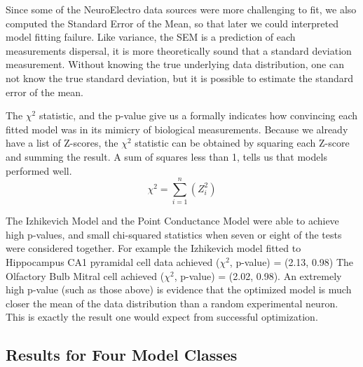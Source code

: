 Since some of the NeuroElectro data sources were more challenging to fit, we also computed the Standard Error of the Mean, so that later we could interpreted model fitting failure. Like variance, the SEM is a prediction of each measurements dispersal, it is more theoretically sound that a standard deviation measurement. Without knowing the true underlying data distribution, one can not know the true standard deviation, but it is possible to estimate the standard error of the mean. 

The $\chi^{2}$ statistic, and the p-value give us a formally indicates how convincing each fitted model was in its mimicry of biological measurements.
Because we already have a list of Z-scores, the $\chi^{2}$ statistic can be obtained by squaring each Z-score and summing the result. A sum of squares less than 1, tells us that models performed well.
\begin{equation}
\chi^{2}=\sum\limits_{i=1}^{n}(Z_{i}^{2})
\end{equation}




The Izhikevich Model and the Point Conductance Model were able to achieve high p-values, and small chi-squared statistics when seven or eight of the tests were considered together.
For example the Izhikevich model fitted to Hippocampus CA1 pyramidal cell data achieved ($\chi^2$, p-value) = (2.13, 0.98)
The Olfactory Bulb Mitral cell achieved ($\chi^2$, p-value) = (2.02, 0.98).
An extremely high p-value (such as those above) is evidence that the optimized model is much closer the mean of the data distribution than a random experimental neuron.
This is exactly the result one would expect from successful optimization.
\subsection{Results for Four Model Classes}

